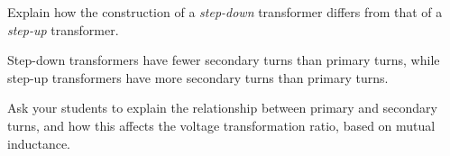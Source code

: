 

Explain how the construction of a {\it step-down} transformer differs from that of a {\it step-up} transformer.







Step-down transformers have fewer secondary turns than primary turns, while step-up transformers have more secondary turns than primary turns.







Ask your students to explain the relationship between primary and secondary turns, and how this affects the voltage transformation ratio, based on mutual inductance.




